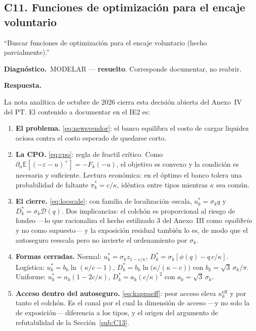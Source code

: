 \documentclass[11pt]{article}
\newcommand{\diag}[1]{\par\noindent\textbf{Diagn\'ostico.}\ #1\par}
\newcommand{\resp}{\par\noindent\textbf{Respuesta.}\par}
\newcommand{\E}{\mathbb{E}}
\newcommand{\keff}{\kappa^{\mathrm{eff}}}
\theoremstyle{definition}
\begin{document}
\subsection{C11. Funciones de optimizaci\'on para el encaje voluntario}
\label{sub:C11}

\begin{jurado}
``Buscar funciones de optimizaci\'on para el encaje voluntario (hecho
parcialmente).''
\end{jurado}

\diag{MODELAR --- \textbf{resuelto}. Corresponde documentar, no reabrir.}

\resp
La nota anal\'itica de octubre de 2026 cierra esta decisi\'on abierta del Anexo~IV
del PT. El contenido a documentar en el IE2 es:

\begin{enumerate}[leftmargin=*,itemsep=2pt]
\item \textbf{El problema.} \eqref{eq:newsvendor}: el banco equilibra el costo de
cargar liquidez ociosa contra el costo esperado de quedarse corto.
\item \textbf{La CPO.} \eqref{eq:cpo}: regla de fractil cr\'itico. Como
$\partial_u\E[(-\varepsilon-u)^+]=-F_k(-u)$, el objetivo es convexo y la
condici\'on es necesaria y suficiente. Lectura econ\'omica: en el \'optimo el banco
tolera una probabilidad de faltante $\pi^*_k=c/\kappa$, id\'entica entre tipos
mientras $\kappa$ sea com\'un.
\item \textbf{El cierre.} \eqref{eq:locscale}: con familia de
localizaci\'on--escala, $u^*_k=\sigma_k q$ y $D^*_k=\sigma_k\mathcal{D}(q)$. Dos
implicancias: el colch\'on es proporcional al riesgo de fondeo ---lo que
racionaliza el hecho estilizado 3 del Anexo~III como \emph{equilibrio} y no como
supuesto--- y la exposici\'on residual tambi\'en lo es, de modo que el autoseguro
reescala pero no invierte el ordenamiento por $\sigma_k$.
\item \textbf{Formas cerradas.} Normal: $u^*_k=\sigma_k z_{1-c/\kappa}$,
$D^*_k=\sigma_k[\phi(q)-q\,c/\kappa]$. Log\'istica:
$u^*_k=b_k\ln(\kappa/c-1)$, $D^*_k=b_k\ln\!\big(\kappa/(\kappa-c)\big)$ con
$b_k=\sqrt3\,\sigma_k/\pi$. Uniforme: $u^*_k=a_k(1-2c/\kappa)$,
$D^*_k=a_k(c/\kappa)^2$ con $a_k=\sqrt3\,\sigma_k$.
\item \textbf{Acceso dentro del autoseguro.} \eqref{eq:kappaeff}: peor acceso
eleva $\keff_k$ y por tanto el colch\'on. Es el canal por el cual la dimensi\'on de
acceso ---y no solo la de exposici\'on--- diferencia a los tipos, y el origen del
argumento de refutabilidad de la Secci\'on~\ref{sub:C13}.

\end{enumerate}
\end{document}
